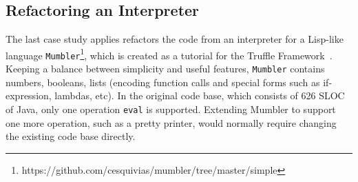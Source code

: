 \begin{comment}
\subsection{Refactoring a Compiler}
The last case study applies our approach to a larger code base of a simple
one-pass compiler for \lstinline{C0} (a subset of \lstinline{C}). This compiler
is a handwritten, monolithic compiler used for educational purposes at Aarhus
University, Denmark\footnote{Source code available at
  http://cs.au.dk/~mis/dOvs/Czero.java}. \lstinline{C0} is restricted to
integers, several control structures and function declaration/definition and
basic I/O statements. All the code (including parsing, code generation for
various structures, error handling) is entangled in one big file. Following our
approach with \mixin, we refactored the code to several smaller interfaces
(including \lstinline{Constants}, \lstinline{MemberFields}, interfaces for
parsing different structures, etc). After the refactoring, the new code does not
reduce code as previous case studies. SLOC for original code without comments
and blank lines is 828, while ours is 830 (for fair comparison, we put all
interfaces into one file when calculating SLOC). However, the case study shows
two things: Classless Java can be applied to real code base such as compilers;
code becomes more modular without the sacrifice of code amount/simplicity.
\marco{Why we do not cite the result of the former study? the one with object algebraes
where the number of lines grown quite a while?}
\end{comment}

\subsection{Refactoring an Interpreter}\label{subsec:int}
The last case study applies refactors the code from an interpreter for
a Lisp-like language
\lstinline{Mumbler}\footnote{https://github.com/cesquivias/mumbler/tree/master/simple},
which is created as a tutorial for the Truffle
Framework~\cite{wurthinger2013one}.  Keeping a balance between
simplicity and useful features, \lstinline{Mumbler} contains numbers,
booleans, lists (encoding function calls and special forms such as
if-expression, lambdas, etc). In the original code base, which
consists of 626 SLOC of Java, only one operation \texttt{eval} is
supported. Extending Mumbler to support one more operation, such as a
pretty printer, would normally require changing the existing code base
directly.

